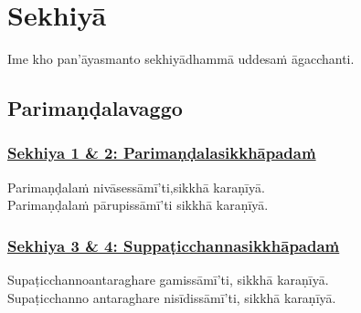 
\section{Sekhiyā}
\label{sekh}

\begin{intro}
	Ime kho pan'āyasmanto sekhiyā\makeatletter\hyperlink{endnote469-appendix}\makeatother \thinspace dhammā uddesaṁ āgacchanti.
\end{intro}

\setsubsecheadstyle{\subsectionFmt}
\subsection{Parimaṇḍalavaggo}

\subsubsection*{\hyperref[training1-2]{Sekhiya 1 \& 2: Parimaṇḍalasikkhāpadaṁ}}
\label{sekh1-2}

Parimaṇḍalaṁ nivāsessāmī'ti,\makeatletter\hyperlink{endnote470-appendix}\makeatother \thinspace sikkhā karaṇīyā.\makeatletter\hyperlink{endnote471-appendix}\makeatother \thinspace\\
Parimaṇḍalaṁ pārupissāmī'ti sikkhā karaṇīyā.



\subsubsection*{\hyperref[training3-4]{Sekhiya 3 \& 4: Suppaṭicchannasikkhāpadaṁ}}
\label{sekh3-4}

Supaṭicchanno\makeatletter\hyperlink{endnote472-appendix}\makeatother \thinspace antaraghare gamissāmī'ti, sikkhā karaṇīyā.\\
Supaṭicchanno antaraghare nisīdissāmī'ti, sikkhā karaṇīyā.



